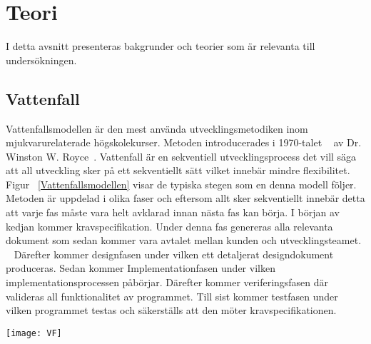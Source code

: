 \section{Teori} \label{sec:Lieth_Wahid-theory}
I detta avsnitt presenteras bakgrunder och teorier som är relevanta till undersökningen. 
\subsection{Vattenfall}
Vattenfallsmodellen är den mest använda utvecklingsmetodiken inom mjukvarurelaterade högskolekurser. Metoden introducerades i 1970-talet  ~\cite{WaterfalM} av Dr. Winston W. Royce~\cite{managing}. Vattenfall är en sekventiell utvecklingsprocess det vill säga att all utveckling sker på ett sekventiellt sätt vilket innebär mindre flexibilitet. Figur ~\ref{Vattenfallsmodellen} visar de typiska 
stegen som en denna modell följer. Metoden är uppdelad i olika faser och eftersom allt sker sekventiellt innebär detta att varje fas måste vara helt avklarad innan nästa fas kan börja.  I början av kedjan kommer kravspecifikation. Under denna fas genereras alla relevanta dokument som sedan kommer vara avtalet mellan kunden och utvecklingsteamet. ~\cite{GameDesign} Därefter kommer designfasen under vilken ett detaljerat designdokument produceras. Sedan kommer Implementationfasen under vilken implementationsprocessen  påbörjar. Därefter kommer veriferingsfasen där valideras all funktionalitet  av programmet. Till sist kommer testfasen under vilken programmet testas och säkerställs  att den möter kravspecifikationen.
\begin{figure*}[h]
	\centering
	\texttt{[image: VF]}
	\caption[Vattenfallsmodellen]{Vattenfallsmodellen~\cite{theWaterFall}}
	\label{Vattenfallsmodellen}
\end{figure*}
